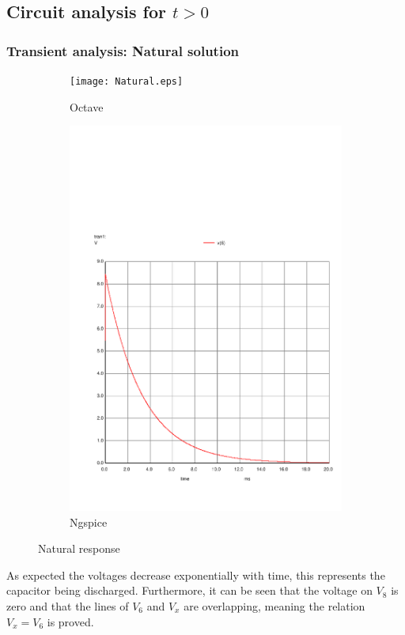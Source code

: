 \subsection{Circuit analysis for $t>0$}
\subsubsection{Transient analysis: Natural solution}



\begin{figure}[H]
\centering
\begin{subfigure}{.5\textwidth}
  \centering
  \texttt{[image: Natural.eps]}
  \caption{Octave}
\end{subfigure}%
\begin{subfigure}{.5\textwidth}
  \centering
  \includegraphics[width=.8\linewidth]{../Simulation/trans_nat.pdf}
  \caption{Ngspice}
\end{subfigure}
\caption{Natural response}
\label{fig:test}
\end{figure}


\indent

As expected the voltages decrease exponentially with time, this represents the capacitor being discharged. Furthermore, it can be seen that the voltage on $V_8$ is zero and that the lines of $V_6$ and $V_x$ are overlapping, meaning the relation $V_x = V_6$ is proved.

